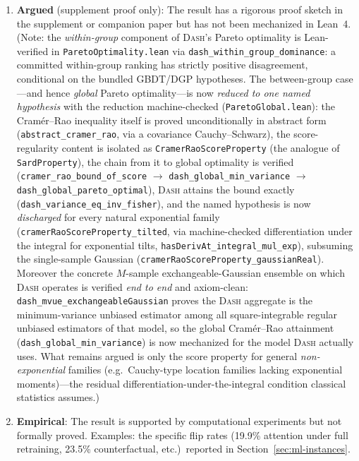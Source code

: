\documentclass[11pt,a4paper]{article}
\newcommand{\DASH}{\textsc{Dash}}
\begin{document}
\begin{enumerate}[label=(\alph*)]
  \item \textbf{Argued} (supplement proof only): The result has a
    rigorous proof sketch in the supplement or companion paper but has
    not been mechanized in Lean~4.  (Note: the \emph{within-group}
    component of \DASH{}'s Pareto optimality is Lean-verified in
    \texttt{ParetoOptimality.lean} via
    \texttt{dash\_within\_group\_dominance}: a committed within-group
    ranking has strictly positive disagreement, conditional on the
    bundled GBDT/DGP hypotheses.  The between-group case---and hence
    \emph{global} Pareto optimality---is now \emph{reduced to one named
    hypothesis} with the reduction machine-checked
    (\texttt{ParetoGlobal.lean}): the Cram\'er--Rao inequality itself is
    proved unconditionally in abstract form
    (\texttt{abstract\_cramer\_rao}, via a covariance Cauchy--Schwarz),
    the score-regularity content is isolated as
    \texttt{CramerRaoScoreProperty} (the analogue of
    \texttt{SardProperty}), the chain from it to global optimality is
    verified (\texttt{cramer\_rao\_bound\_of\_score} $\to$
    \texttt{dash\_global\_min\_variance} $\to$
    \texttt{dash\_global\_pareto\_optimal}), \DASH{} attains the bound
    exactly (\texttt{dash\_variance\_eq\_inv\_fisher}), and the named
    hypothesis is now \emph{discharged} for every natural exponential
    family (\texttt{cramerRaoScoreProperty\_tilted}, via machine-checked
    differentiation under the integral for exponential tilts,
    \texttt{hasDerivAt\_integral\_mul\_exp}), subsuming the single-sample
    Gaussian (\texttt{cramerRaoScoreProperty\_gaussianReal}).  Moreover
    the concrete $M$-sample exchangeable-Gaussian ensemble on which
    \DASH{} operates is verified \emph{end to end} and axiom-clean:
    \texttt{dash\_mvue\_exchangeableGaussian} proves the \DASH{} aggregate
    is the minimum-variance unbiased estimator among all square-integrable
    regular unbiased estimators of that model, so the global
    Cram\'er--Rao attainment (\texttt{dash\_global\_min\_variance}) is now
    mechanized for the model \DASH{} actually uses.  What remains argued
    is only the score property for general \emph{non-exponential}
    families (e.g.\ Cauchy-type location families lacking exponential
    moments)---the residual differentiation-under-the-integral condition
    classical statistics assumes.)

  \item \textbf{Empirical}: The result is supported by computational
    experiments but not formally proved.  Examples: the specific flip
    rates (19.9\% attention under full retraining, 23.5\%
    counterfactual, etc.)\ reported in Section~\ref{sec:ml-instances}.
\end{enumerate}
\end{document}
